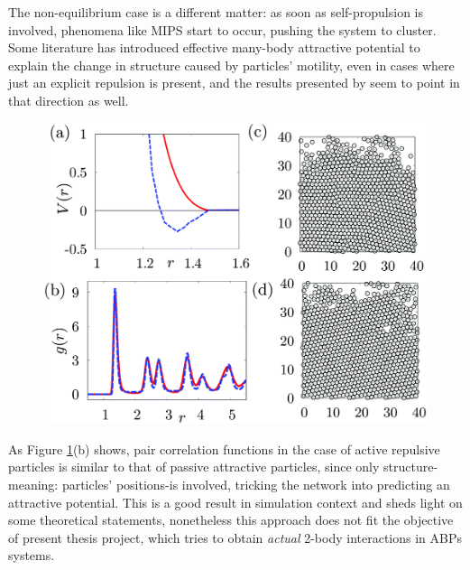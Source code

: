 \documentclass[../../master_thesis_np.tex]{subfiles}
\begin{document}
	The non-equilibrium case is a different matter: as soon as self-propulsion is involved, phenomena like MIPS start to occur, pushing the system to cluster. Some literature has introduced effective many-body attractive potential to explain the change in structure caused by particles' motility, even in cases where just an explicit repulsion is present, and the results presented by \citeauthor{bag_interaction_2021} seem to point in that direction as well. 
 	\begin{figure}[htp]
		\centering
		\includegraphics[width=\singfigwidth]{bag2.png}
		\caption{\parencite{bag_interaction_2021}}
		\label{fig:bag2}
	\end{figure}
	As Figure \ref{fig:bag2}(b) shows, pair correlation functions in the case of active repulsive particles is similar to that of passive attractive particles, since only structure-meaning: particles' positions-is involved, tricking the network into predicting an attractive potential. This is a good result in simulation context and sheds light on some theoretical statements, nonetheless this approach does not fit the objective of present thesis project, which tries to obtain \emph{actual} 2-body interactions in ABPs systems. 
	
\end{document}
